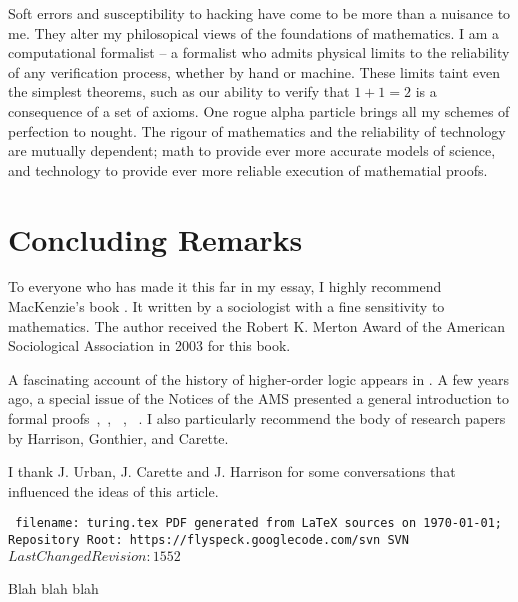 \documentclass{llncs}
\def\svninfo{{\tt
  filename: turing.tex\hfill\break
  PDF generated from LaTeX sources on \today; \hfill\break
  Repository Root: https://flyspeck.googlecode.com/svn \hfill\break
  SVN $LastChangedRevision: 1552 $
  }
  }
\begin{document}
Soft errors and susceptibility to hacking
have come to be more than a nuisance to me.  They alter my
philosopical views of the foundations of mathematics.  I am a
computational formalist -- a formalist who admits physical
limits to the reliability of any verification process, whether by hand
or machine.  These limits taint even the simplest theorems, such as
our ability to verify that $1+1=2$ is a consequence of a set of
axioms.  One rogue alpha particle brings all my schemes of
perfection to nought.  %
The rigour of
mathematics and the reliability of technology are mutually dependent;
math to provide ever more accurate models of science, and technology
to provide ever more reliable execution of mathematial proofs.

\newpage
\section{Concluding Remarks}


To everyone who has made it this far in my essay,  I
highly recommend MacKenzie's book \cite{Mac}.  It written by a
sociologist with a fine sensitivity to mathematics.  The author
received the Robert K. Merton Award of the American Sociological
Association in 2003 for this book.

A fascinating account of the history of higher-order logic appears in
\cite{Gor}.  A few years ago, a special issue of the Notices of the
AMS presented a general introduction to formal
proofs~\cite{Hales:2008:formal},~\cite{Harrison:2008:formal},
~\cite{gonthier:2008:formal}, ~\cite{Wiedijk:2008:formal}.  I also particularly
recommend the body of research papers by Harrison, Gonthier, and
Carette.



\bigskip

I thank J. Urban, J. Carette and J. Harrison 
for some conversations that influenced the ideas of this article.




\raggedright



\bigskip
\noindent
\svninfo




\bigskip
Blah blah blah
\end{document}
